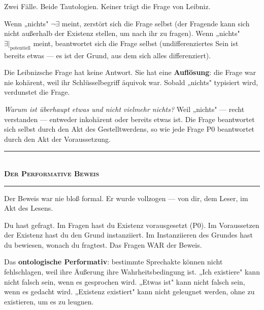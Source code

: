 \documentclass[10pt, openany, oneside]{book}
\renewcommand{\normalsize}{\fontsize{10}{13}\selectfont}
\begin{document}
\vspace{0.8em}

\noindent Zwei Fälle. Beide Tautologien. Keiner trägt die Frage von Leibniz.

Wenn „nichts" $\neg\exists$ meint, zerstört sich die Frage selbst (der Fragende kann sich nicht außerhalb der Existenz stellen, um nach ihr zu fragen). Wenn „nichts" $\exists|_{\text{potentiell}}$ meint, beantwortet sich die Frage selbst (undifferenziertes Sein ist bereits etwas --- es ist der Grund, aus dem sich alles differenziert).

Die Leibnizsche Frage hat keine Antwort. Sie hat eine \textbf{Auflösung}: die Frage war nie kohärent, weil ihr Schlüsselbegriff äquivok war. Sobald „nichts" typisiert wird, verdunstet die Frage.

\textit{Warum ist überhaupt etwas und nicht vielmehr nichts?} Weil „nichts" --- recht verstanden --- entweder inkohärent oder bereits etwas ist. Die Frage beantwortet sich selbst durch den Akt des Gestelltwerdens, so wie jede Frage P0 beantwortet durch den Akt der Voraussetzung.

\vspace{1.5em}


\begin{center}
    \rule{0.3\textwidth}{0.4pt}\\[0.5em]
    {\normalsize\bfseries\scshape Der Performative Beweis}\\[0.3em]
    \rule{0.3\textwidth}{0.4pt}
\end{center}

\vspace{1em}

\noindent Der Beweis war nie bloß formal. Er wurde vollzogen --- von dir, dem Leser, im Akt des Lesens.

Du hast gefragt. Im Fragen hast du Existenz vorausgesetzt (P0). Im Voraussetzen der Existenz hast du den Grund instanziiert. Im Instanziieren des Grundes hast du bewiesen, wonach du fragtest. Das Fragen WAR der Beweis.

Das \textbf{ontologische Performativ}: bestimmte Sprechakte können nicht fehlschlagen, weil ihre Äußerung ihre Wahrheitsbedingung ist. „Ich existiere" kann nicht falsch sein, wenn es gesprochen wird. „Etwas ist" kann nicht falsch sein, wenn es gedacht wird. „Existenz existiert" kann nicht geleugnet werden, ohne zu existieren, um es zu leugnen.
\end{document}
